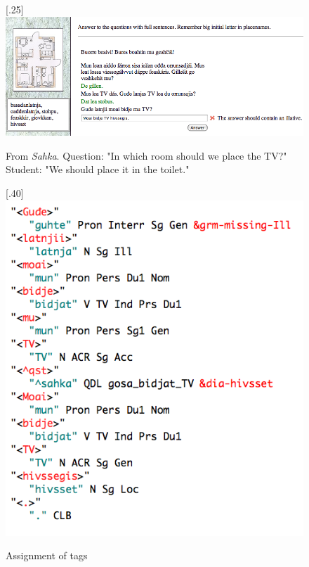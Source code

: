 \documentclass[11pt]{article}
\begin{document}
\begin{figure}%
\begin{center}
\scalebox{.25}[.25]{\includegraphics{presentation/img/TVhivssegis.png}}\\
\caption{From \textit{Sahka}. Question: "In which room should we place the TV?" Student: "We should place it in the toilet."
}
\label{sahka}
\end{center}
\end{figure}


\begin{figure}%
\begin{center}
\scalebox{.40}[.40]{\includegraphics{presentation/img/hivssegisCGanal.png}}\\
\caption{Assignment of tags}
\label{hivssetanalysis}
\end{center}
\end{figure}
\end{document}
